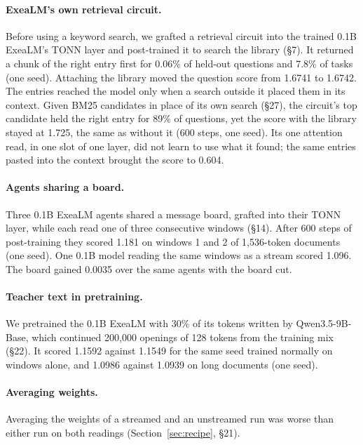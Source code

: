 \documentclass[10pt,twocolumn,letterpaper]{article}
\newcommand{\sect}[1]{\S#1}
\begin{document}
\paragraph{ExeaLM's own retrieval circuit.}
Before using a keyword search, we grafted a retrieval circuit into the trained 0.1B ExeaLM's TONN layer and post-trained it to search the library (\sect{7}).
It returned a chunk of the right entry first for 0.06\% of held-out questions and 7.8\% of tasks (one seed).
Attaching the library moved the question score from 1.6741 to 1.6742.
The entries reached the model only when a search outside it placed them in its context.
Given BM25 candidates in place of its own search (\sect{27}), the circuit's top candidate held the right entry for 89\% of questions, yet the score with the library stayed at 1.725, the same as without it (600 steps, one seed).
Its one attention read, in one slot of one layer, did not learn to use what it found; the same entries pasted into the context brought the score to 0.604.

\paragraph{Agents sharing a board.}
Three 0.1B ExeaLM agents shared a message board, grafted into their TONN layer, while each read one of three consecutive windows (\sect{14}).
After 600 steps of post-training they scored 1.181 on windows 1 and 2 of 1,536-token documents (one seed).
One 0.1B model reading the same windows as a stream scored 1.096.
The board gained 0.0035 over the same agents with the board cut.

\paragraph{Teacher text in pretraining.}
We pretrained the 0.1B ExeaLM with 30\% of its tokens written by Qwen3.5-9B-Base, which continued 200,000 openings of 128 tokens from the training mix (\sect{22}).
It scored 1.1592 against 1.1549 for the same seed trained normally on windows alone, and 1.0986 against 1.0939 on long documents (one seed).

\paragraph{Averaging weights.}
Averaging the weights of a streamed and an unstreamed run was worse than either run on both readings (Section~\ref{sec:recipe}, \sect{21}).
\end{document}
